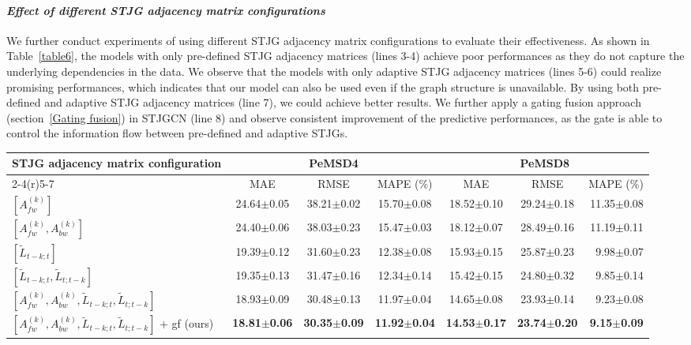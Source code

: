 \documentclass[10pt,journal,compsoc]{IEEEtran}
\begin{document}
\paragraph{\textit{Effect of different STJG adjacency matrix configurations}}

We further conduct experiments of using different STJG adjacency matrix configurations to evaluate their effectiveness. As shown in Table~\ref{table6}, the models with only pre-defined STJG adjacency matrices (lines 3-4) achieve poor performances as they do not capture the underlying dependencies in the data. We observe that the models with only adaptive STJG adjacency matrices (lines 5-6) could realize promising performances, which indicates that our model can also be used even if the graph structure is unavailable. By using both pre-defined and adaptive STJG adjacency matrices (line 7), we could achieve better results. We further apply a gating fusion approach (section~\ref{Gating fusion}) in STJGCN (line 8) and observe consistent improvement of the predictive performances, as the gate is able to control the information flow between pre-defined and adaptive STJGs.    

\begin{table*}
	\caption{Effect of different STJG adjacency matrix configurations. The term ``gf'' in the last line denotes the gating fusion approach.}
	\label{table6}
	\centering
	\begin{tabular}{lcccccr}
		\toprule
		\multirow{2}{*}{STJG adjacency matrix configuration}										& \multicolumn{3}{c}{PeMSD4}														& \multicolumn{3}{c}{PeMSD8}														\\
		\cmidrule(r){2-4}\cmidrule(r){5-7}
		& MAE						& RMSE						& MAPE (\%)					& MAE						& RMSE						& MAPE (\%)					\\
		\midrule	
		$ [ A_{fw}^{(k)} ] $																& 24.64$\pm$0.05			& 38.21$\pm$0.02			& 15.70$\pm$0.08			& 18.52$\pm$0.10			& 29.24$\pm$0.18			& 11.35$\pm$0.08			\\
		$ [ A_{fw}^{(k)},A_{bw}^{(k)} ] $													& 24.40$\pm$0.06			& 38.03$\pm$0.23			& 15.47$\pm$0.03			& 18.12$\pm$0.07			& 28.49$\pm$0.16			& 11.19$\pm$0.11			\\
		$ [ \tilde{L}_{t-k;t} ] $															& 19.39$\pm$0.12			& 31.60$\pm$0.23			& 12.38$\pm$0.08			& 15.93$\pm$0.15			& 25.87$\pm$0.23			& 9.98$\pm$0.07				\\
		$ [ \tilde{L}_{t-k;t},\tilde{L}_{t;t-k} ] $     									& 19.35$\pm$0.13			& 31.47$\pm$0.16			& 12.34$\pm$0.14			& 15.42$\pm$0.15			& 24.80$\pm$0.32			& 9.85$\pm$0.14				\\
		$ [ A_{fw}^{(k)},A_{bw}^{(k)},\tilde{L}_{t-k;t},\tilde{L}_{t;t-k} ] $				& 18.93$\pm$0.09			& 30.48$\pm$0.13			& 11.97$\pm$0.04 			& 14.65$\pm$0.08			& 23.93$\pm$0.14			& 9.23$\pm$0.08				\\
		\midrule	
		$ [ A_{fw}^{(k)},A_{bw}^{(k)},\tilde{L}_{t-k;t},\tilde{L}_{t;t-k} ] $ + gf (ours)	& \textbf{18.81$\pm$0.06}	& \textbf{30.35$\pm$0.09}	& \textbf{11.92$\pm$0.04}	& \textbf{14.53$\pm$0.17}	& \textbf{23.74$\pm$0.20}	& \textbf{9.15$\pm$0.09}	\\	
		\bottomrule
	\end{tabular}
\end{table*} 
\end{document}
